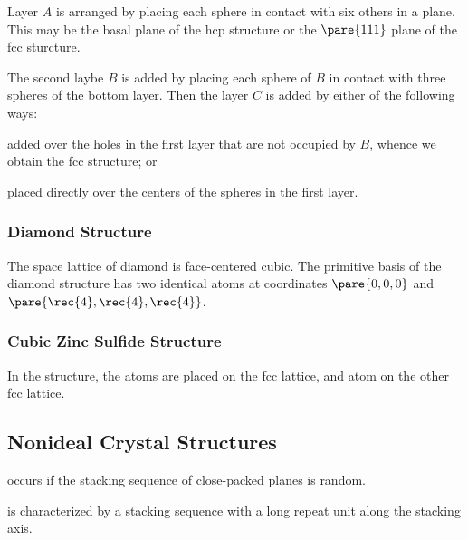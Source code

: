 \documentclass[hidelinks]{article}
\begin{document}
Layer $A$ is arranged by placing each sphere in contact with six others in a plane. This may be the basal plane of the hcp structure or the $\pare{111}$ plane of the fcc sturcture.
\par
The second laybe $B$ is added by placing each sphere of $B$ in contact with three spheres of the bottom layer. Then the layer $C$ is added by either of the following ways:
\begin{citemize}
    \item added over the holes in the first layer that are not occupied by $B$, whence we obtain the fcc structure; or
    \item placed directly over the centers of the spheres in the first layer.
\end{citemize}


\subsubsection{Diamond Structure} %
\label{ssub:diamond_structure}

The space lattice of diamond is face-centered cubic. The primitive basis of the diamond structure has two identical atoms at coordinates $\pare{0,0,0}$ and $\displaystyle \pare{\rec{4},\rec{4},\rec{4}}$.


\subsubsection{Cubic Zinc Sulfide Structure} %
\label{ssub:cubic_zinc_sulfide_structure}

In the  structure, the  atoms are placed on the fcc lattice, and  atom on the other fcc lattice.



\subsection{Nonideal Crystal Structures} %
\label{sub:nonideal_crystal_structures}

 occurs if the stacking sequence of close-packed planes is random.
\par
{} is characterized by a stacking sequence with a long repeat unit along the stacking axis.


\end{document}
